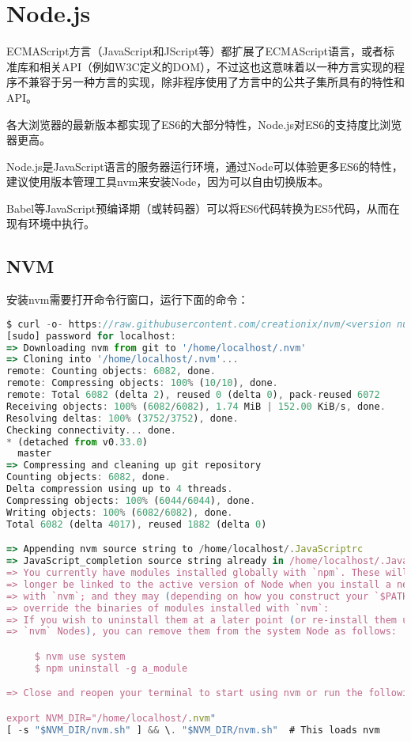 \chapter{Node.js}

ECMAScript方言（JavaScript和JScript等）都扩展了ECMAScript语言，或者标准库和相关API（例如W3C定义的DOM），不过这也这意味着以一种方言实现的程序不兼容于另一种方言的实现，除非程序使用了方言中的公共子集所具有的特性和API。

各大浏览器的最新版本都实现了ES6的大部分特性，Node.js对ES6的支持度比浏览器更高。

Node.js是JavaScript语言的服务器运行环境，通过Node可以体验更多ES6的特性，建议使用版本管理工具nvm来安装Node，因为可以自由切换版本。

Babel等JavaScript预编译期（或转码器）可以将ES6代码转换为ES5代码，从而在现有环境中执行。

\section{NVM}


安装nvm需要打开命令行窗口，运行下面的命令：

\begin{lstlisting}[language=JavaScript]
$ curl -o- https://raw.githubusercontent.com/creationix/nvm/<version number>/install.sh | JavaScript
[sudo] password for localhost: 
=> Downloading nvm from git to '/home/localhost/.nvm'
=> Cloning into '/home/localhost/.nvm'...
remote: Counting objects: 6082, done.
remote: Compressing objects: 100% (10/10), done.
remote: Total 6082 (delta 2), reused 0 (delta 0), pack-reused 6072
Receiving objects: 100% (6082/6082), 1.74 MiB | 152.00 KiB/s, done.
Resolving deltas: 100% (3752/3752), done.
Checking connectivity... done.
* (detached from v0.33.0)
  master
=> Compressing and cleaning up git repository
Counting objects: 6082, done.
Delta compression using up to 4 threads.
Compressing objects: 100% (6044/6044), done.
Writing objects: 100% (6082/6082), done.
Total 6082 (delta 4017), reused 1882 (delta 0)

=> Appending nvm source string to /home/localhost/.JavaScriptrc
=> JavaScript_completion source string already in /home/localhost/.JavaScriptrc
=> You currently have modules installed globally with `npm`. These will no
=> longer be linked to the active version of Node when you install a new node
=> with `nvm`; and they may (depending on how you construct your `$PATH`)
=> override the binaries of modules installed with `nvm`:
=> If you wish to uninstall them at a later point (or re-install them under your
=> `nvm` Nodes), you can remove them from the system Node as follows:

     $ nvm use system
     $ npm uninstall -g a_module

=> Close and reopen your terminal to start using nvm or run the following to use it now:

export NVM_DIR="/home/localhost/.nvm"
[ -s "$NVM_DIR/nvm.sh" ] && \. "$NVM_DIR/nvm.sh"  # This loads nvm
\end{lstlisting}



